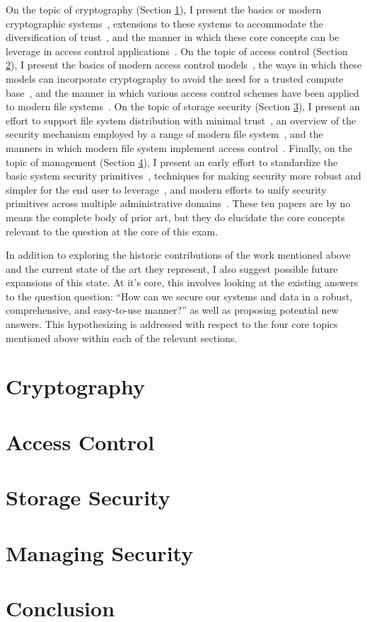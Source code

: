 \documentclass{sig-alternate}
\begin{document}
On the topic of cryptography (Section \ref{sec:crypto}), I present the
basics or modern cryptographic systems~\cite{Diffie1976}, extensions
to these systems to accommodate the diversification of
trust~\cite{Shamir1979}, and the manner in which these core concepts
can be leverage in access control
applications~\cite{Bethencourt2007}. On the topic of access control
(Section \ref{sec:ac}), I present the basics of modern access control
models~\cite{Sandhu1996}, the ways in which these models can
incorporate cryptography to avoid the need for a trusted compute
base~\cite{Bethencourt2007}, and the manner in which various access
control schemes have been applied to modern file
systems~\cite{Miltchev2008}. On the topic of storage security (Section
\ref{sec:fs}), I present an effort to support file system distribution
with minimal trust~\cite{Mazieres1999}, an overview of the security
mechanism employed by a range of modern file system~\cite{Kher2005},
and the manners in which modern file system implement access
control~\cite{Miltchev2008}. Finally, on the topic of management
(Section \ref{sec:mgmt}), I present an early effort to standardize the
basic system security primitives~\cite{Samar1996}, techniques for
making security more robust and simpler for the end user to
leverage~\cite{Cox2002}, and modern efforts to unify security
primitives across multiple administrative
domains~\cite{Morgan2004}. These ten papers are by no means the
complete body of prior art, but they do elucidate the core concepts
relevant to the question at the core of this exam.

In addition to exploring the historic contributions of the work
mentioned above and the current state of the art they represent, I
also suggest possible future expansions of this state. At it's core,
this involves looking at the existing answers to the question
question: ``How can we secure our systems and data in a robust,
comprehensive, and easy-to-use manner?'' as well as proposing
potential new answers. This hypothesizing is addressed with respect to
the four core topics mentioned above within each of the relevant
sections.

\section{Cryptography}
\label{sec:crypto}

\section{Access Control}
\label{sec:ac}

\section{Storage Security}
\label{sec:fs}

\section{Managing Security}
\label{sec:mgmt}

\section{Conclusion}
\label{sec:conclusion}



\end{document}
